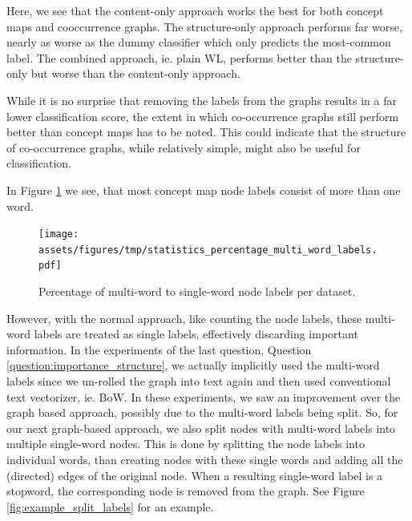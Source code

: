 Here, we see that the content-only approach works the best for both concept maps and cooccurrence graphs.
The structure-only approach performs far worse, nearly as worse as the dummy classifier which only predicts the most-common label.
The combined approach, ie. plain WL, performs better than the structure-only but worse than the content-only approach.

While it is no surprise that removing the labels from the graphs results in a far lower classification score, the extent in which co-occurrence graphs still perform better than concept maps has to be noted.
This could indicate that the structure of co-occurrence graphs, while relatively simple, might also be useful for classification.


In Figure \ref{fig:statistics_percentage_multi_word_labels} we see, that most concept map node labels consist of more than one word.

\begin{figure}[htb!]
	\centering
	\texttt{[image: assets/figures/tmp/statistics\_percentage\_multi\_word\_labels.pdf]}
	\caption[Statistics: Percentage multi-word node labels]{Percentage of multi-word to single-word node labels per dataset.}\label{fig:statistics_percentage_multi_word_labels}
\end{figure}

However, with the normal approach, like counting the node labels, these multi-word labels are treated as single labels, effectively discarding important information.
In the experiments of the last question, Question \ref{question:importance_structure}, we actually implicitly used the multi-word labels since we un-rolled the graph into text again and then used conventional text vectorizer, ie. BoW.
In these experiments, we saw an improvement over the graph based approach, possibly due to the multi-word labels being split.
So, for our next graph-based approach, we also split nodes with multi-word labels into multiple single-word nodes.
This is done by splitting the node labels into individual words, than creating nodes with these single words and adding all the (directed) edges of the original node.
When a resulting single-word label is a stopword, the corresponding node is removed from the graph.
See Figure \ref{fig:example_split_labels} for an example.

